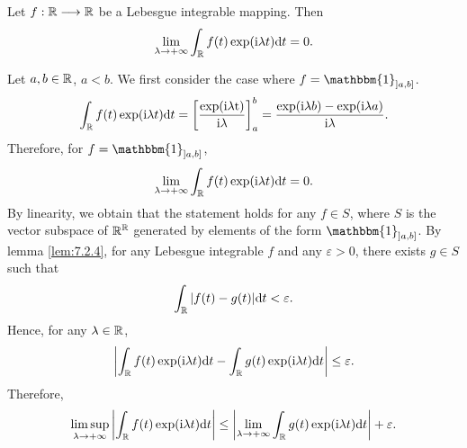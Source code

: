 \begin{lemmaenv}\label{lem:8.5.7}
    Let $f : \mathbb{R} \longrightarrow \mathbb{R}$ be a Lebesgue integrable mapping.
    Then
    $$\lim_{\lambda \to + \infty} \int_{\mathbb{R}} f(t) \exp(\mathrm{i} \lambda t) \mathrm{d} t = 0.$$
\end{lemmaenv}
\begin{proofenv}
    Let $a,b \in \mathbb{R}$, $a<b$.
    We first consider the case where $f = \mathbbm{1}_{\interval[open left]{a}{b}}$.
    $$\int_{\mathbb{R}} f(t) \exp(\mathrm{i} \lambda t) \mathrm{d} t = \left[\frac{\exp(\mathrm{i \lambda t})}{\mathrm{i} \lambda}\right]^{b}_{a} = \frac{\exp(\mathrm{i} \lambda b) - \exp(\mathrm{i}\lambda a)}{\mathrm{i} \lambda}.$$
    Therefore, for $f = \mathbbm{1}_{\interval[open left]{a}{b}}$,
    $$\lim_{\lambda \to + \infty} \int_{\mathbb{R}} f(t) \exp(\mathrm{i} \lambda t) \mathrm{d} t = 0.$$
    By linearity, we obtain that the statement holds for any $f \in S$, where $S$ is the vector subspace of $\mathbb{R}^{\mathbb{R}}$ generated by elements of the form $\mathbbm{1}_{\interval[open left]{a}{b}}$.
    By lemma \ref{lem:7.2.4}, for any Lebesgue integrable $f$ and any $\varepsilon > 0$, there exists $g \in S$ such that
    $$\int_{\mathbb{R}} |f(t) - g(t)| \mathrm{d} t < \varepsilon.$$
    Hence, for any $\lambda \in \mathbb{R}$,
    $$\left|\int_{\mathbb{R}} f(t) \exp(\mathrm{i} \lambda t) \mathrm{d} t - \int_{\mathbb{R}} g(t) \exp(\mathrm{i} \lambda t) \mathrm{d} t\right| \le \varepsilon.$$
    Therefore,
    $$\limsup_{\lambda \rightarrow +\infty} \left|\int_{\mathbb{R}} f(t) \exp(\mathrm{i} \lambda t) \mathrm{d} t\right| \le \left|\lim_{\lambda \rightarrow + \infty} \int_{\mathbb{R}} g(t) \exp(\mathrm{i} \lambda t) \mathrm{d} t\right| + \varepsilon.$$
\end{proofenv}

